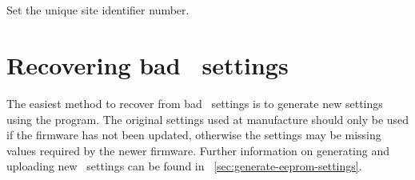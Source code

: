 \subsection{}
Set the unique site identifier number.

\section[Recovering bad EEPROM settings]{%
  Recovering bad \eeprom\ settings}
\label{sec:bad-eeprom-settings}

The easiest method to recover from bad \eeprom\ settings is to
generate new settings using the 
program. The original settings used at manufacture should only be used
if the firmware has not been updated, otherwise the settings may be
missing values required by the newer firmware. Further information on
generating and uploading new \eeprom\ settings can be found in
\secname~\ref{sec:generate-eeprom-settings}.

